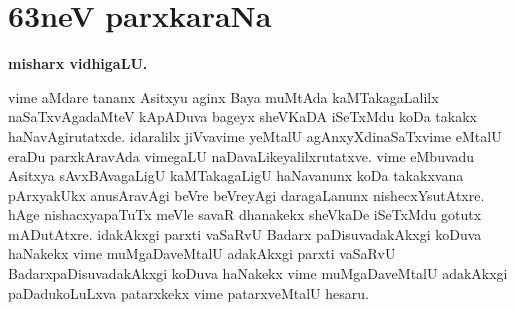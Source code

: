 \chapter{63neV parxkaraNa}

\begin{center}
{\bf misharx vidhigaLU.}
\end{center}

vime aMdare tananx Asitxyu aginx Baya muMtAda kaMTakagaLalilx naSaTxvAgadaMteV kApADuva bageyx sheVKaDA iSeTxMdu koDa takakx haNavAgirutatxde. idaralilx jiVvavime yeMtalU agAnxyXdinaSaTxvime eMtalU eraDu parxkAra\-vAda vimegaLU naDavaLikeyalilxrutatxve. vime eMbuvadu Asitxya sAvxBAvagaLigU kaMTakagaLigU haNavanunx koDa takakxvana pArxyakUkx anusAravAgi beVre beVreyAgi daragaLanunx nishecxYsutAtxre. hAge nishacxyapaTuTx meVle savaR dhanakekx sheVkaDe iSeTxMdu gotutx mADutAtxre. idakAkxgi parxti vaSaRvU Badarx paDisuvadakAkxgi koDuva haNakekx vime muMgaDaveMtalU adakAkxgi parxti vaSaRvU BadarxpaDisuvadakAkxgi koDuva haNakekx vime muMgaDaveMtalU adakAkxgi paDadukoLuLxva patarxkekx vime patarxveMtalU hesaru.

